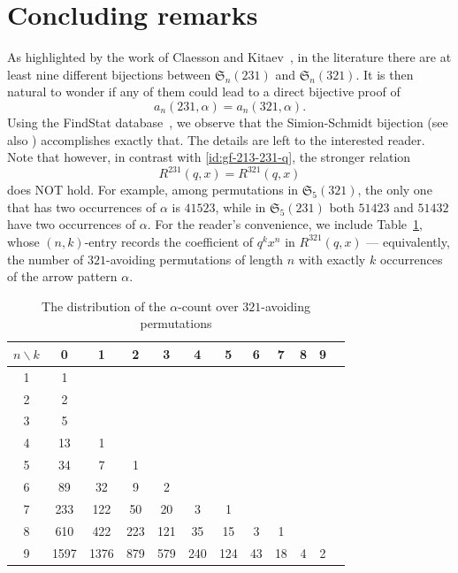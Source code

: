 \documentclass[12pt]{amsart}
\numberwithin{equation}{section}
\theoremstyle{plain}
\def\fS{\mathfrak{S}}
\begin{document}
\section{Concluding remarks}

As highlighted by the work of Claesson and Kitaev~\cite{CK2008}, in the literature there are at least nine different bijections between $\fS_n(231)$ and $\fS_n(321)$. It is then natural to wonder if any of them could lead to a direct bijective proof of
$$a_n(231,\alpha)=a_n(321,\alpha).$$
Using the FindStat database~\cite{findstat}, we observe that the Simion-Schmidt bijection \cite{SS1985} (see also \cite[Section~3.3]{CK2008}) accomplishes exactly that. The details are left to the interested reader. Note that however, in contrast with \eqref{id:gf-213-231-q}, the stronger relation 
$$R^{231}(q,x)=R^{321}(q,x)$$ 
does NOT hold. For example, among permutations in $\fS_5(321)$, the only one that has two occurrences of $\alpha$ is $41523$, while in $\fS_5(231)$ both $51423$ and $51432$ have two occurrences of $\alpha$. For the reader's convenience, we include Table~\ref{tab:R^321(q,x)}, whose $(n,k)$-entry records the coefficient of $q^kx^n$ in $R^{321}(q,x)$ --- equivalently, the number of $321$-avoiding permutations of length $n$ with exactly $k$ occurrences of the arrow pattern $\alpha$.

\smallskip 
\begin{table}[!h]
\renewcommand{\arraystretch}{1.1}
    \centering
    \begin{tabular}{c|ccccccccccc}
        $n \backslash k$ & 0 & 1 & 2 & 3 & 4 & 5 & 6 & 7 & 8 & 9 \\ \hline
        1 & 1 \\ 
        2 & 2 \\ 
        3 & 5 \\ 
        4 & 13 & 1  \\ 
        5 & 34 & 7 & 1 \\ 
        6 & 89 & 32 & 9 & 2 \\
        7 & 233 & 122 & 50 & 20 & 3 & 1 \\
        8 & 610 & 422 & 223 & 121 & 35 & 15 & 3 & 1 \\
        9 & 1597 & 1376 & 879 & 579 & 240 & 124 & 43 & 18 & 4 & 2
    \end{tabular}
    \vspace{3mm}
    \caption{The distribution of the $\alpha$-count over $321$-avoiding permutations \label{tab:R^321(q,x)} }
\end{table}
\end{document}
